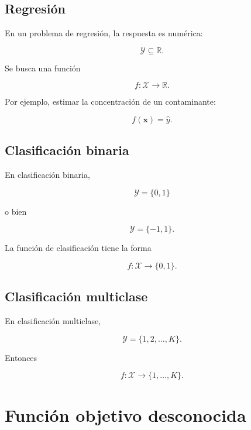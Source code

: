 \documentclass[
  spanish,
  10.5pt,
  letterpaper,
  DIV=11,
  numbers=noendperiod,
  oneside,
  open=any]{scrreprt}
\theoremstyle{definition}
\theoremstyle{definition}
\theoremstyle{plain}
\theoremstyle{remark}
\begin{document}

\subsection*{Regresión}\label{regresiuxf3n}

En un problema de regresión, la respuesta es numérica:

\[
\mathcal{Y}\subseteq\mathbb{R}.
\]

Se busca una función

\[
f:\mathcal{X}\to\mathbb{R}.
\]

Por ejemplo, estimar la concentración de un contaminante:

\[
f(\mathbf{x})
=
\widehat{y}.
\]

\subsection*{Clasificación binaria}\label{clasificaciuxf3n-binaria}

En clasificación binaria,

\[
\mathcal{Y}=\{0,1\}
\]

o bien

\[
\mathcal{Y}=\{-1,1\}.
\]

La función de clasificación tiene la forma

\[
f:\mathcal{X}\to\{0,1\}.
\]

\subsection*{Clasificación
multiclase}\label{clasificaciuxf3n-multiclase}

En clasificación multiclase,

\[
\mathcal{Y}
=
\{1,2,\ldots,K\}.
\]

Entonces

\[
f:\mathcal{X}\to\{1,\ldots,K\}.
\]

\section*{Función objetivo
desconocida}\label{funciuxf3n-objetivo-desconocida}

\end{document}
